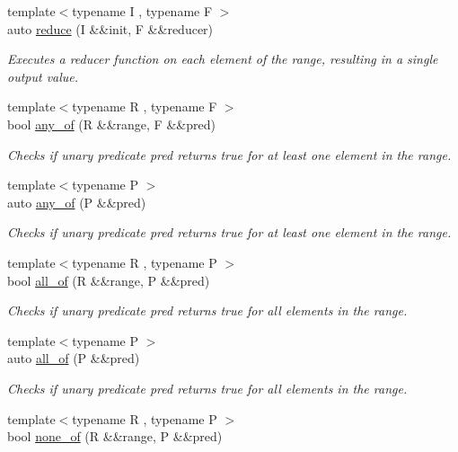 \begin{DoxyCompactItemize}
{\footnotesize template$<$typename I , typename F $>$ }\\auto \mbox{\hyperlink{namespacerah_a6a6b7b7e3b78bb4bd16372fbb688c152}{reduce}} (I \&\&init, F \&\&reducer)
\begin{DoxyCompactList}\small\item\em Executes a reducer function on each element of the range, resulting in a single output value. \end{DoxyCompactList}\item 
{\footnotesize template$<$typename R , typename F $>$ }\\bool \mbox{\hyperlink{namespacerah_a836c57da2bd108c491f3ba96786f6aa4}{any\+\_\+of}} (R \&\&range, F \&\&pred)
\begin{DoxyCompactList}\small\item\em Checks if unary predicate pred returns true for at least one element in the range. \end{DoxyCompactList}\item 
{\footnotesize template$<$typename P $>$ }\\auto \mbox{\hyperlink{namespacerah_aa3f330b2354859d8a9e6df794a1e7a1a}{any\+\_\+of}} (P \&\&pred)
\begin{DoxyCompactList}\small\item\em Checks if unary predicate pred returns true for at least one element in the range. \end{DoxyCompactList}\item 
{\footnotesize template$<$typename R , typename P $>$ }\\bool \mbox{\hyperlink{namespacerah_aaf7abb6066c8adfe6959691c3a3ea4e2}{all\+\_\+of}} (R \&\&range, P \&\&pred)
\begin{DoxyCompactList}\small\item\em Checks if unary predicate pred returns true for all elements in the range. \end{DoxyCompactList}\item 
{\footnotesize template$<$typename P $>$ }\\auto \mbox{\hyperlink{namespacerah_a4066165c960917a330beeed75a0f96e7}{all\+\_\+of}} (P \&\&pred)
\begin{DoxyCompactList}\small\item\em Checks if unary predicate pred returns true for all elements in the range. \end{DoxyCompactList}\item 
{\footnotesize template$<$typename R , typename P $>$ }\\bool \mbox{\hyperlink{namespacerah_a2a3ff8b7f73d480ac0827f9a41a3c92a}{none\+\_\+of}} (R \&\&range, P \&\&pred)

\end{DoxyCompactItemize}
